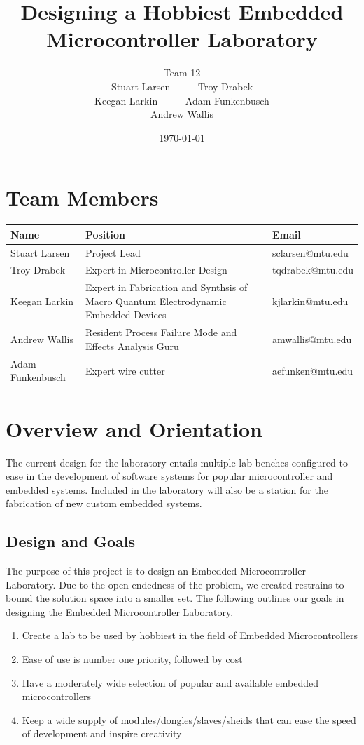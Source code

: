 \documentclass[12pt]{article}
\title{Designing a Hobbiest Embedded Microcontroller Laboratory}
\author{Team 12 \\ Stuart Larsen \ \ \ \ \   Troy Drabek \\ Keegan Larkin \ \ \ \ \   Adam Funkenbusch \\ Andrew Wallis }
\date{\today}
\begin{document}
\maketitle
\thispagestyle{empty}

\pagebreak


\section{Team Members}
\begin{center}
  \begin{tabular}{  l | p{8cm} | l }
    Name & Position & Email \\
    \hline
    Stuart Larsen & Project Lead & sclarsen@mtu.edu \\ 
    Troy Drabek & Expert in Microcontroller Design & tqdrabek@mtu.edu \\
    Keegan Larkin & Expert in Fabrication and Synthsis of Macro Quantum Electrodynamic Embedded Devices  & kjlarkin@mtu.edu \\
    Andrew Wallis & Resident Process Failure Mode and Effects Analysis Guru & amwallis@mtu.edu \\
    Adam Funkenbusch & Expert wire cutter & aefunken@mtu.edu \\
  \end{tabular}
\end{center}

\section{Overview and Orientation}
  The current design for the laboratory entails multiple lab benches configured to ease in the development of software systems for popular microcontroller and embedded systems. Included in the laboratory will also be a station for the fabrication of new custom embedded systems.

\subsection{Design and Goals}
The purpose of this project is to design an Embedded Microcontroller Laboratory. Due to the open endedness of the problem, we created restrains to bound the solution space into a smaller set. The following outlines our goals in designing the Embedded Microcontroller Laboratory.

\begin{enumerate}
  \item Create a lab to be used by hobbiest in the field of Embedded Microcontrollers
  \item Ease of use is number one priority, followed by cost
  \item Have a moderately wide selection of popular and available embedded microcontrollers
  \item Keep a wide supply of modules/dongles/slaves/sheids that can ease the speed of development and inspire creativity
\end{enumerate}
\end{document}
